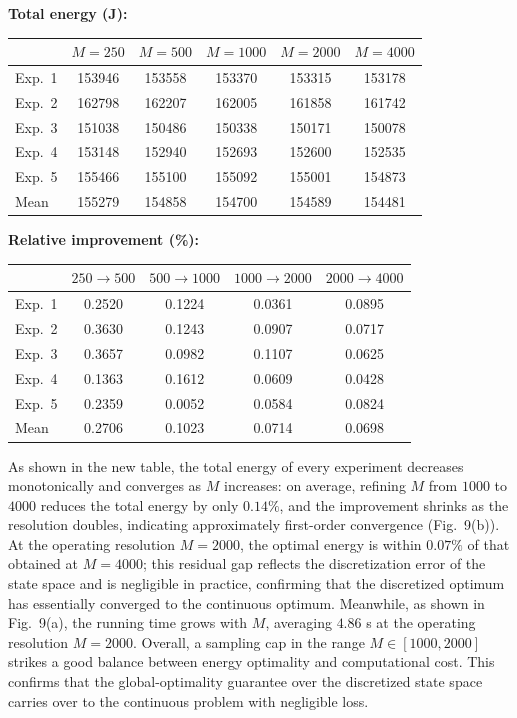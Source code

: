 \begin{revresponse}[]
\begin{changes}
\textbf{Total energy (J):}
\begin{center}
\small
\begin{tabular}{lccccc}
\toprule
 & $M=250$ & $M=500$ & $M=1000$ & $M=2000$ & $M=4000$ \\
\midrule
 Exp.\ 1 & 153946 & 153558 & 153370 & 153315 & 153178 \\
 Exp.\ 2 & 162798 & 162207 & 162005 & 161858 & 161742 \\
 Exp.\ 3 & 151038 & 150486 & 150338 & 150171 & 150078 \\
 Exp.\ 4 & 153148 & 152940 & 152693 & 152600 & 152535 \\
 Exp.\ 5 & 155466 & 155100 & 155092 & 155001 & 154873 \\
\midrule
 Mean & 155279 & 154858 & 154700 & 154589 & 154481 \\
\bottomrule
\end{tabular}
\end{center}

\textbf{Relative improvement (\%):}
\begin{center}
\small
\begin{tabular}{lcccc}
\toprule
 & $250\!\to\!500$ & $500\!\to\!1000$ & $1000\!\to\!2000$ & $2000\!\to\!4000$ \\
\midrule
 Exp.\ 1 & 0.2520 & 0.1224 & 0.0361 & 0.0895 \\
 Exp.\ 2 & 0.3630 & 0.1243 & 0.0907 & 0.0717 \\
 Exp.\ 3 & 0.3657 & 0.0982 & 0.1107 & 0.0625 \\
 Exp.\ 4 & 0.1363 & 0.1612 & 0.0609 & 0.0428 \\
 Exp.\ 5 & 0.2359 & 0.0052 & 0.0584 & 0.0824 \\
\midrule
 Mean & 0.2706 & 0.1023 & 0.0714 & 0.0698 \\
\bottomrule
\end{tabular}
\end{center}

		As shown in the new table, the total energy of every experiment decreases monotonically and converges as $M$ increases: on average, refining $M$ from $1000$ to $4000$ reduces the total energy by only $0.14\%$, and the improvement shrinks as the resolution doubles, indicating approximately first-order convergence (Fig.~9(b)). At the operating resolution $M=2000$, the optimal energy is within $0.07\%$ of that obtained at $M=4000$; this residual gap reflects the discretization error of the state space and is negligible in practice, confirming that the discretized optimum has essentially converged to the continuous optimum. Meanwhile, as shown in Fig.~9(a), the running time grows with $M$, averaging $4.86$ s at the operating resolution $M=2000$. Overall, a sampling cap in the range $M\in[1000,2000]$ strikes a good balance between energy optimality and computational cost. This confirms that the global-optimality guarantee over the discretized state space carries over to the continuous problem with negligible loss.


\end{changes}
\end{revresponse}
